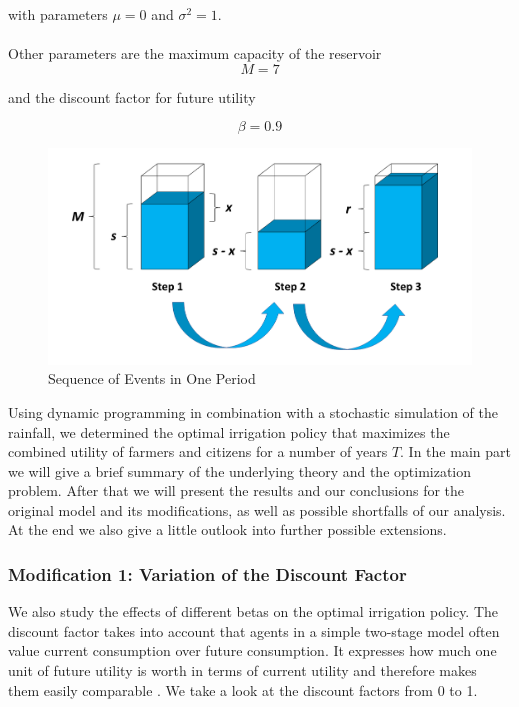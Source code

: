 \documentclass[12pt, a4paper, oneside]{article}
\begin{document}
with parameters $\mu = 0$ and $\sigma^2 = 1$.\\\\

Other parameters are the maximum capacity of the reservoir
\begin{equation}
	M = 7
\end{equation}

and the discount factor for future utility 

\begin{equation}
	\beta = 0.9
\end{equation}

\begin{figure}[ht]
	\includegraphics[width=1\textwidth]{figures/CESchaubild_Cut.png}
	\caption{Sequence of Events in One Period}
	\label{fig:Sequence}
\end{figure}

Using dynamic programming in combination with a stochastic simulation of the rainfall, we determined the optimal irrigation policy that maximizes the combined utility of farmers and citizens for a number of years $T$.
In the main part we will give a brief summary of the underlying theory and the optimization problem.
After that we will present the results and our conclusions for the original model and its modifications, as well as possible shortfalls of our analysis.
At the end we also give a little outlook into further possible extensions.


\subsubsection{Modification 1: Variation of the Discount Factor}
We also study the effects of different betas on the optimal irrigation policy. 
The discount factor takes into account that agents in a simple two-stage model often value current consumption over future consumption.
It expresses how much one unit of future utility is worth in terms of current utility and therefore makes them easily comparable \citep{kruschwitz2014investitionsrechnung}.
We take a look at the discount factors from 0 to 1.
\end{document}
